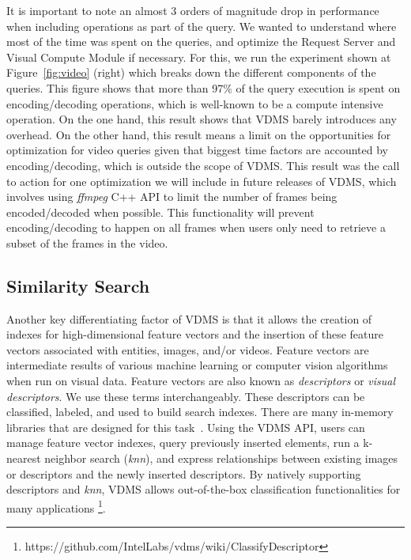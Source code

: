 It is important to note an almost 3 orders of magnitude drop in performance
when including operations as part of the query.
We wanted to understand where most of the time was spent on the queries,
and optimize the Request Server and Visual Compute Module
if necessary. For this, we run the experiment shown at
Figure~\ref{fig:video} (right) which breaks down the different components of the
queries. This figure shows that more than 97\% of the query execution is spent
on encoding/decoding operations, which is well-known to be a
compute intensive operation\cite{videosgoogle}.
On the one hand, this result shows that VDMS barely introduces any overhead. 
On the other hand, this result means a limit on the opportunities 
for optimization for video queries given that biggest time factors 
are accounted by encoding/decoding, which is outside the scope of VDMS.
This result was the call to action for one optimization we will include
in future releases of VDMS, which involves using \textit{ffmpeg} C++ API to
limit the number of frames being encoded/decoded when possible.
This functionality will prevent encoding/decoding to happen on all frames
when users only need to retrieve a subset of the frames in the video.


\subsection{Similarity Search}
\label{features}

Another key differentiating factor of VDMS is that it allows the creation of
indexes for high-dimensional feature vectors and the insertion of
these feature vectors associated with entities, images, and/or videos.
Feature vectors are intermediate results of various machine
learning or computer vision algorithms when run on visual data.
Feature vectors are also known as \textit{descriptors}
or \textit{visual descriptors}. We use these terms interchangeably.
These descriptors can be classified, labeled, and used to build search
indexes. There are many in-memory libraries that are designed for
this task~\cite{flann, faiss}.
Using the VDMS API, users can manage feature vector indexes,
query previously inserted elements,
run a k-nearest neighbor search (\textit{knn}), and express relationships
between existing images or descriptors and
the newly inserted descriptors.
By natively supporting descriptors and \textit{knn},
VDMS allows out-of-the-box classification functionalities for many applications
\footnote{https://github.com/IntelLabs/vdms/wiki/ClassifyDescriptor}.

